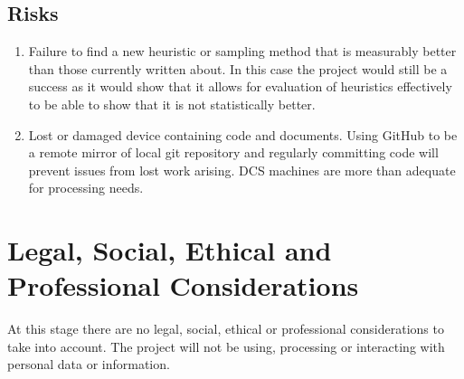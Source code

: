 \documentclass{article}
\begin{document}
\subsection{Risks} \label{riskDetails}
\begin{enumerate}
	\item Failure to find a new heuristic or sampling method that is measurably better than those currently written about.
	      In this case the project would still be a success as it would show that it allows for evaluation of heuristics effectively to be able to show that it is not statistically better.

	\item Lost or damaged device containing code and documents.
	      Using GitHub to be a remote mirror of local git repository and regularly committing code will prevent issues from lost work arising.
	      DCS machines are more than adequate for processing needs.
\end{enumerate}

\section{Legal, Social, Ethical and Professional Considerations} \label{lsep}

At this stage there are no legal, social, ethical or professional considerations to take into account.
The project will not be using, processing or interacting with personal data or information.

\newpage

{}
\end{document}
